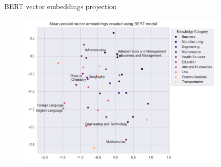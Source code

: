 \documentclass{beamer}
\begin{document}

\begin{frame}{BERT vector embeddings projection}
  \begin{figure}[ht!]
    \centering
    \includegraphics[width=0.9\textwidth]{../plots/base_bert.png}
\end{figure}

\end{frame}

\end{document}

